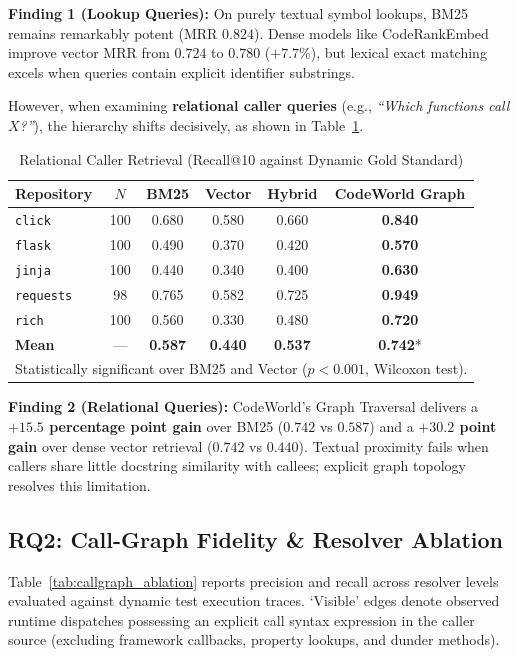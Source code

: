 \documentclass[conference]{IEEEtran}
\begin{document}
\textbf{Finding 1 (Lookup Queries):} On purely textual symbol lookups, BM25 remains remarkably potent (MRR $0.824$). Dense models like CodeRankEmbed improve vector MRR from $0.724$ to $0.780$ ($+7.7\%$), but lexical exact matching excels when queries contain explicit identifier substrings.

However, when examining \textbf{relational caller queries} (e.g., \textit{``Which functions call $X$?''}), the hierarchy shifts decisively, as shown in Table~\ref{tab:retrieval_callers}.

\begin{table}[htbp]
\caption{Relational Caller Retrieval (Recall@10 against Dynamic Gold Standard)}
\label{tab:retrieval_callers}
\centering
\small
\begin{tabular}{lccccc}
\toprule
\textbf{Repository} & \textbf{$N$} & \textbf{BM25} & \textbf{Vector} & \textbf{Hybrid} & \textbf{CodeWorld Graph} \\
\midrule
\texttt{click}     & 100 & 0.680 & 0.580 & 0.660 & \textbf{0.840} \\
\texttt{flask}     & 100 & 0.490 & 0.370 & 0.420 & \textbf{0.570} \\
\texttt{jinja}     & 100 & 0.440 & 0.340 & 0.400 & \textbf{0.630} \\
\texttt{requests}  & 98  & 0.765 & 0.582 & 0.725 & \textbf{0.949} \\
\texttt{rich}      & 100 & 0.560 & 0.330 & 0.480 & \textbf{0.720} \\
\midrule
\textbf{Mean}      & --- & \textbf{0.587} & \textbf{0.440} & \textbf{0.537} & \textbf{0.742}* \\
\bottomrule
\multicolumn{6}{l}{\footnotesize *Statistically significant over BM25 and Vector ($p < 0.001$, Wilcoxon test).}
\end{tabular}
\end{table}

\textbf{Finding 2 (Relational Queries):} CodeWorld's Graph Traversal delivers a \textbf{$+15.5$ percentage point gain} over BM25 ($0.742$ vs $0.587$) and a \textbf{$+30.2$ point gain} over dense vector retrieval ($0.742$ vs $0.440$). Textual proximity fails when callers share little docstring similarity with callees; explicit graph topology resolves this limitation.

\subsection{RQ2: Call-Graph Fidelity \& Resolver Ablation}
Table~\ref{tab:callgraph_ablation} reports precision and recall across resolver levels evaluated against dynamic test execution traces. `Visible' edges denote observed runtime dispatches possessing an explicit call syntax expression in the caller source (excluding framework callbacks, property lookups, and dunder methods).
\end{document}
